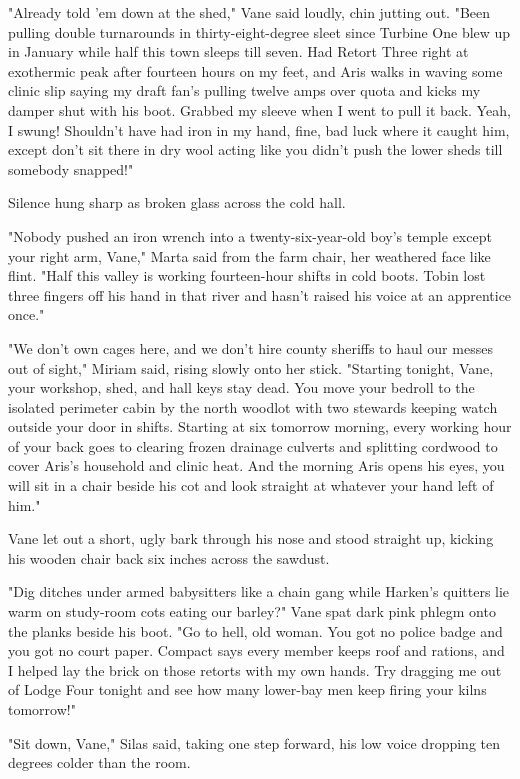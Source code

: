 "Already told 'em down at the shed," Vane said loudly, chin jutting out. "Been pulling double turnarounds in thirty-eight-degree sleet since Turbine One blew up in January while half this town sleeps till seven. Had Retort Three right at exothermic peak after fourteen hours on my feet, and Aris walks in waving some clinic slip saying my draft fan's pulling twelve amps over quota and kicks my damper shut with his boot. Grabbed my sleeve when I went to pull it back. Yeah, I swung! Shouldn't have had iron in my hand, fine, bad luck where it caught him, except don't sit there in dry wool acting like you didn't push the lower sheds till somebody snapped!"

Silence hung sharp as broken glass across the cold hall.

"Nobody pushed an iron wrench into a twenty-six-year-old boy's temple except your right arm, Vane," Marta said from the farm chair, her weathered face like flint. "Half this valley is working fourteen-hour shifts in cold boots. Tobin lost three fingers off his hand in that river and hasn't raised his voice at an apprentice once."

"We don't own cages here, and we don't hire county sheriffs to haul our messes out of sight," Miriam said, rising slowly onto her stick. "Starting tonight, Vane, your workshop, shed, and hall keys stay dead. You move your bedroll to the isolated perimeter cabin by the north woodlot with two stewards keeping watch outside your door in shifts. Starting at six tomorrow morning, every working hour of your back goes to clearing frozen drainage culverts and splitting cordwood to cover Aris's household and clinic heat. And the morning Aris opens his eyes, you will sit in a chair beside his cot and look straight at whatever your hand left of him."

Vane let out a short, ugly bark through his nose and stood straight up, kicking his wooden chair back six inches across the sawdust.

"Dig ditches under armed babysitters like a chain gang while Harken's quitters lie warm on study-room cots eating our barley?" Vane spat dark pink phlegm onto the planks beside his boot. "Go to hell, old woman. You got no police badge and you got no court paper. Compact says every member keeps roof and rations, and I helped lay the brick on those retorts with my own hands. Try dragging me out of Lodge Four tonight and see how many lower-bay men keep firing your kilns tomorrow!"

"Sit down, Vane," Silas said, taking one step forward, his low voice dropping ten degrees colder than the room.


